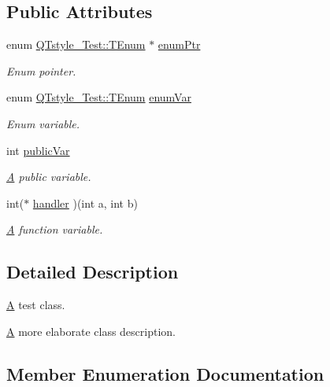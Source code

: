 \subsection*{Public Attributes}
\begin{DoxyCompactItemize}
\item 
enum \mbox{\hyperlink{class_q_tstyle___test_a0525f798cda415a94fedeceb806d2c49}{Q\+Tstyle\+\_\+\+Test\+::\+T\+Enum}} $\ast$ \mbox{\hyperlink{class_q_tstyle___test_a973a4566c9a036f4eca508ba5fe80dcb}{enum\+Ptr}}
\begin{DoxyCompactList}\small\item\em Enum pointer. \end{DoxyCompactList}\item 
enum \mbox{\hyperlink{class_q_tstyle___test_a0525f798cda415a94fedeceb806d2c49}{Q\+Tstyle\+\_\+\+Test\+::\+T\+Enum}} \mbox{\hyperlink{class_q_tstyle___test_adb265d815b43f1f7f0de0e8b8852a5d0}{enum\+Var}}
\begin{DoxyCompactList}\small\item\em Enum variable. \end{DoxyCompactList}\item 
int \mbox{\hyperlink{class_q_tstyle___test_aabf7b2e9ed83ea44aca4d213baae06d3}{public\+Var}}
\begin{DoxyCompactList}\small\item\em \mbox{\hyperlink{class_a}{A}} public variable. \end{DoxyCompactList}\item 
int($\ast$ \mbox{\hyperlink{class_q_tstyle___test_a79dd4e5498f09057775a819d911349e2}{handler}} )(int a, int b)
\begin{DoxyCompactList}\small\item\em \mbox{\hyperlink{class_a}{A}} function variable. \end{DoxyCompactList}\end{DoxyCompactItemize}


\subsection{Detailed Description}
\mbox{\hyperlink{class_a}{A}} test class. 

\mbox{\hyperlink{class_a}{A}} more elaborate class description. 

\subsection{Member Enumeration Documentation}
\mbox{\label{class_q_tstyle___test_a0525f798cda415a94fedeceb806d2c49}} 
